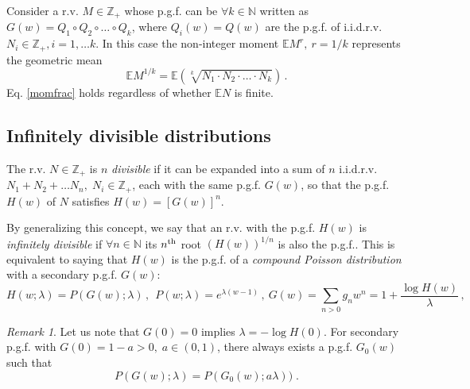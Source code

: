 \documentclass[a4paper,12pt]{amsart}
\newcommand{\E}{\mathbb{E}}
\newcommand{\N}{\mathbb{N}}
\newcommand{\Z}{\mathbb{Z}_{+}}
\newcommand{\iid}{i.i.d.}
\theoremstyle{definition}
\theoremstyle{remark}
\newtheorem{Remark}{Remark}[section]
\begin{document}
  Consider a r.v. $M \in \Z $ whose p.g.f. can be $\forall k \in\N$ written as  $G(w) = Q_1\circ Q_2\circ \ldots \circ Q_k$, where $Q_i(w)=Q(w)$ are the p.g.f. of \iid{}r.v. $N_i \in \Z, i=1,\ldots k$. In this case the non-integer moment $\E M^r,~ r=1/k$   represents the geometric mean
\begin{equation}\label{momfrac}
\E M^{1/k}=\E (\sqrt[k]{N_1\cdot N_2\cdot \ldots \cdot N_k})\,. 
\end{equation}
Eq. \ref{momfrac} holds regardless of whether $\E N$ is finite. 
\subsection{Infinitely divisible distributions} \label{infdsub}
The r.v. $N\in \Z$ is $n$ {\it divisible} if it can be expanded into a sum of $n$ \iid{}r.v. $N_1+N_2+\ldots N_n,\; N_i \in \Z$, each with the same p.g.f. $G(w)$, so that the  p.g.f. $H(w)$ of $N$ satisfies $H(w)=[G(w)]^n$.

By generalizing this concept, we say that an r.v. with the p.g.f. $H(w)$ is {\it infinitely divisible}  if $\forall n\in \N$  its $n^{\rm th}$ root $(H(w))^{1/n}$ is also the p.g.f.. This is equivalent to saying that $H(w)$ is the p.g.f. of a {\it compound Poisson distribution} \cite{Feller1} with a secondary p.g.f. $G(w)$: 
\begin{equation}
\label{eq: cpd}
H(w;\lambda)=P(G(w);\lambda)\,,~~ P(w;\lambda)=e^{\lambda(w-1)}\,,~
G(w)=\sum_{n>0} g_n w^n=1+\frac{\log H(w)}{\lambda}\,,
\end{equation}
 \begin{Remark}
 Let us note that $G(0)=0$ implies  $\lambda=-\log H(0)$. 
 For secondary p.g.f. with $G(0)=1-a>0,\; a\in(0,1)$,  there always exists a p.g.f. $G_0(w)$ such that 
\begin{equation}\label{zero-ext-compP}
P(G(w);\lambda)=P(G_0(w);a\lambda))\;.    
\end{equation}
\end{Remark}
\end{document}
